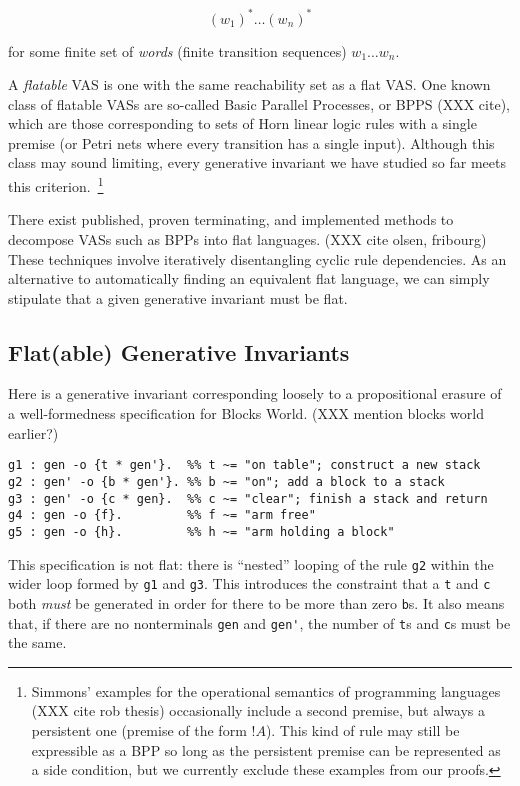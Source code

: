 \documentclass[fullpage, 11pt]{article}
\newcommand{\bang}{!}
\begin{document}
\[
(w_1)^*\dots(w_n)^*
\]

for some finite set of {\em words} (finite transition sequences) $w_1 \dots
w_n$.

A {\em flatable} VAS is one with the same reachability set as a flat VAS.
One known class of flatable VASs are so-called Basic Parallel Processes, or
BPPS (XXX cite), which are those corresponding to sets of Horn linear logic
rules with a single premise (or Petri nets where every transition has a
single input). Although this class may sound limiting, every generative
invariant we have studied so far meets this criterion.~\footnote{Simmons' examples
for the operational semantics of programming languages (XXX cite rob
thesis) occasionally include a second premise, but always a persistent one
(premise of the form $\bang A$). This kind of rule may still be expressible
as a BPP so long as the persistent premise can be represented as a side
condition, but we currently exclude these examples from our proofs.}

There exist published, proven terminating, and implemented methods to
decompose VASs such as BPPs into flat languages. (XXX cite olsen, fribourg)
These techniques involve iteratively disentangling cyclic rule
dependencies. As an alternative to automatically finding an equivalent flat
language, we can simply stipulate that a given generative invariant must be
flat.

\subsection{Flat(able) Generative Invariants}

Here is a generative invariant corresponding loosely to a propositional
erasure of a well-formedness specification for Blocks World. (XXX mention
blocks world earlier?)

\begin{verbatim}
g1 : gen -o {t * gen'}.  %% t ~= "on table"; construct a new stack
g2 : gen' -o {b * gen'}. %% b ~= "on"; add a block to a stack
g3 : gen' -o {c * gen}.  %% c ~= "clear"; finish a stack and return
g4 : gen -o {f}.         %% f ~= "arm free"
g5 : gen -o {h}.         %% h ~= "arm holding a block"
\end{verbatim}

This specification is not flat: there is ``nested'' looping of the rule
\verb|g2| within the wider loop formed by \verb|g1| and \verb|g3|. This
introduces the constraint that a \verb|t| and \verb|c| both {\em must} be
generated in order for there to be more than zero \verb|b|s. It also means
that, if there are no nonterminals \verb|gen| and \verb|gen'|, the number
of \verb|t|s and \verb|c|s must be the same.
\end{document}
